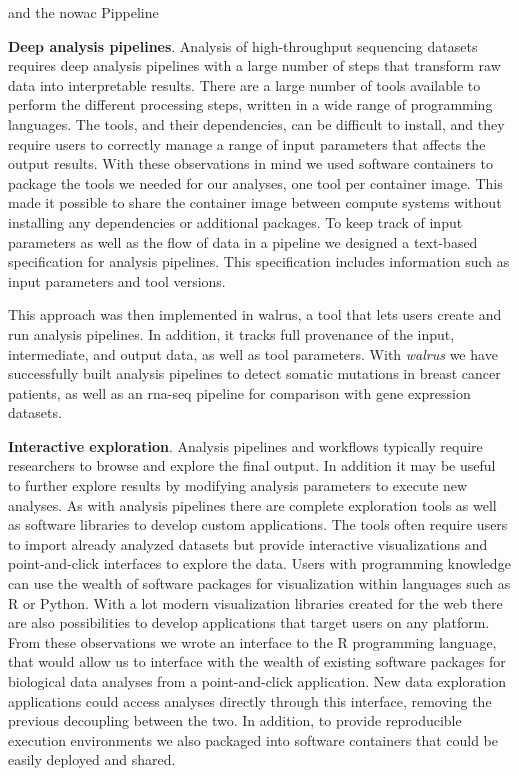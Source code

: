and the \gls{nowac} Pippeline 

\textbf{Deep analysis pipelines}. 
Analysis of high-throughput sequencing datasets requires deep analysis pipelines
with a large number of steps that transform raw data into interpretable
results\cite{diao2015building}. There are a large number of tools available to
perform the different processing steps, written in a wide range of programming
languages. The tools, and their dependencies, can be difficult to install, and
they require users to correctly manage a range of input parameters that affects
the output results. With these observations in mind we used software containers
to package the tools we needed for our analyses, one tool per container image.
This made it possible to share the container image between compute systems
without installing any dependencies or additional packages. To keep track of
input parameters as well as the flow of data in a pipeline we designed a
text-based specification for analysis pipelines. This specification includes
information such as input parameters and tool versions. 

This approach was then implemented in walrus, a tool
that lets users create and run analysis pipelines. In addition, it tracks full
provenance of the input, intermediate, and output data, as well as tool
parameters. With \emph{walrus} we have successfully built analysis pipelines to
detect somatic mutations in breast cancer patients, as well as an \gls{rna}-seq
pipeline for comparison with gene expression datasets. 

\textbf{Interactive exploration}. Analysis pipelines and workflows typically
require researchers to browse and explore the final output. In addition it may
be useful to further explore results by modifying analysis parameters to execute
new analyses. As with analysis pipelines there are complete exploration tools as
well as software libraries to develop custom applications. The tools often
require users to import already analyzed datasets but provide interactive
visualizations and point-and-click interfaces to explore the data. Users with
programming knowledge can use the wealth of software packages for visualization
within languages such as R or Python. With a lot modern visualization libraries
created for the web there are also possibilities to develop applications that
target users on any platform. From these observations we wrote an interface to
the R programming language, that would allow us to interface with the wealth of
existing software packages for biological data analyses from a point-and-click
application. New data exploration applications could access analyses directly
through this interface, removing the previous decoupling between the two. In
addition, to provide reproducible execution environments we also packaged into
software containers that could be easily deployed and shared. 

